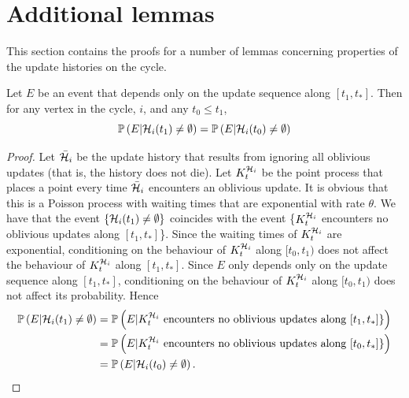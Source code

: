 	\section{Additional lemmas}
	\label{sec:additional lemmas 1D}
	This section contains the proofs for a number of lemmas concerning properties of the update histories on the cycle.

	\begin{lemma}
	\label{lem:replace conditioning}
		Let $E$ be an event that depends only on the update sequence along $[t_1, t_*]$. Then for any vertex in the cycle, $i$, and any $t_0 \leq t_1$,
		\begin{equation}
			\mathbb{P}\left(E | \mathcal{H}_i(t_1) \neq \emptyset \right) = \mathbb{P}\left(E | \mathcal{H}_i(t_0) \neq \emptyset \right)
		\end{equation}
	\end{lemma}
	\begin{proof}
		Let $\bar{\mathcal{H}}_i$ be the update history that results from ignoring all oblivious updates (that is, the history does not die). Let $K_t^{\mathcal{H}_i}$ be the point process that places a point every time $\bar{\mathcal{H}}_i$ encounters an oblivious update. It is obvious that this is a Poisson process with waiting times that are exponential with rate $\theta$. We have that the event $\{\mathcal{H}_i(t_1) \neq \emptyset \}$ coincides with the event	\{$K_t^{\mathcal{H}_i}$ encounters no oblivious updates along $[t_1, t_*]$\}. Since the waiting times of $K_t^{\mathcal{H}_i}$ are exponential, conditioning on the behaviour of $K_t^{\mathcal{H}_i}$ along $[t_0, t_1)$ does not affect the behaviour of $K_t^{\mathcal{H}_i}$ along $[t_1, t_*]$. Since $E$ only depends only on the update sequence along $[t_1, t_*]$, conditioning on the behaviour of $K_t^{\mathcal{H}_i}$ along $[t_0, t_1)$ does not affect its probability. Hence
		\begin{align}
			\mathbb{P}\left(E | \mathcal{H}_i(t_1) \neq \emptyset \right) &= \mathbb{P}\left(E | K_t^{\mathcal{H}_i} \text{ encounters no oblivious updates along } [t_1, t_*]\} \right)\\
			&= \mathbb{P}\left(E | K_t^{\mathcal{H}_i} \text{ encounters no oblivious updates along } [t_0, t_*]\} \right)\\
			&= \mathbb{P}\left(E | \mathcal{H}_i(t_0) \neq \emptyset \right).
		\end{align}

	\end{proof}


